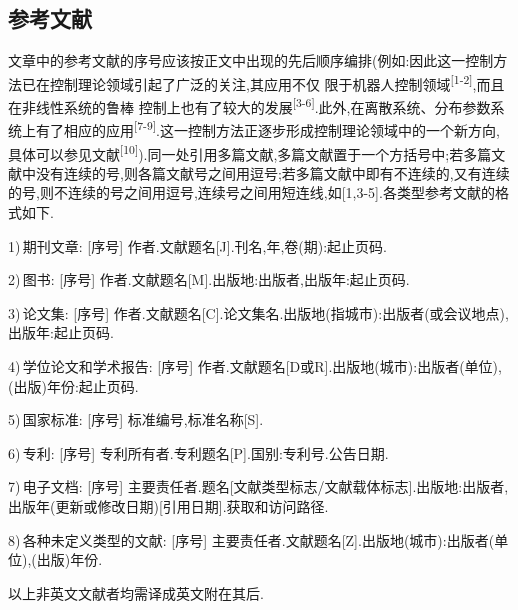 \documentclass{ctacn}%
\begin{document}
\begin{multicols}{2}

\section{参考文献}
文章中的参考文献的序号应该按正文中出现的先后顺序编排(例如:因此这一控制方法已在控制理论领域引起了广泛的关注,其应用不仅
限于机器人控制领域\textsuperscript{[1-2]},而且在非线性系统的鲁棒
控制上也有了较大的发展\textsuperscript{[3-6]}.\;此外,在离散系统、分布参数系统上有了相应的应用\textsuperscript{[7-9]}.\;这一控制方法正逐步形成控制理论领域中的一个新方向,具体可以参见文献\textsuperscript{[10]}).\;同一处引用多篇文献,多篇文献置于一个方括号中;若多篇文献中没有连续的号,则各篇文献号之间用逗号;若多篇文献中即有不连续的,又有连续的号,则不连续的号之间用逗号,连续号之间用短连线,如[1,3-5].\;各类型参考文献的格式如下.

1)\,期刊文章:
[序号] 作者.\;文献题名[J].\;刊名,年,卷(期):起止页码.


2)\,图书:
[序号] 作者.\;文献题名[M].\;出版地:出版者,出版年:起止页码.

3)\,论文集:
[序号] 作者.\;文献题名[C].\;论文集名.\;出版地(指城市):出版者(或会议地点), 出版年:起止页码.

4)\,学位论文和学术报告:
[序号] 作者.\;文献题名[D或R].\;出版地(城市):出版者(单位),(出版)年份:起止页码.

5)\,国家标准:
[序号] 标准编号,标准名称[S].

6)\,专利:
[序号] 专利所有者.\;专利题名[P].\;国别:专利号.\;公告日期.

7)\,电子文档:
[序号] 主要责任者.\;题名[文献类型标志/文献载体标志].\;出版地:出版者, 出版年(更新或修改日期)[引用日期].\;获取和访问路径.

8)\,各种未定义类型的文献: [序号] 主要责任者.\;文献题名[Z].\;出版地(城市):出版者(单位),(出版)年份.

以上非英文文献者均需译成英文附在其后.




\end{multicols}
\end{document}
